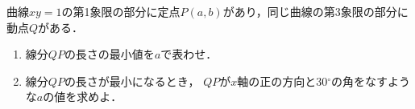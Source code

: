 \documentclass[../../main.tex]{subfiles}
\begin{document}
曲線$xy=1$の第1象限の部分に定点$P(a,b)$があり，同じ曲線の第3象限の部分に動点$Q$がある．
\begin{enumerate}
  \item 線分$QP$の長さの最小値を$a$で表わせ．
  \item 線分$QP$の長さが最小になるとき，
    $QP$が$x$軸の正の方向と30$^\circ$の角をなすような$a$の値を求めよ．
\end{enumerate}
\end{document}
